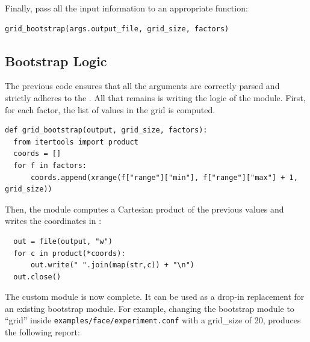Finally, pass all the input information to an appropriate function:
\begin{verbatim}
grid_bootstrap(args.output_file, grid_size, factors)
\end{verbatim}

\subsection{Bootstrap Logic}

The previous code ensures that all the arguments are correctly parsed and strictly adheres to the .
All that remains is writing the logic of the module. First, for each factor, the list of values in the grid is computed.

\begin{verbatim}
def grid_bootstrap(output, grid_size, factors):
  from itertools import product
  coords = []
  for f in factors:
      coords.append(xrange(f["range"]["min"], f["range"]["max"] + 1, grid_size))
\end{verbatim}

Then, the module computes a Cartesian product of the previous values and writes the coordinates in :

\begin{verbatim}
  out = file(output, "w")
  for c in product(*coords):
      out.write(" ".join(map(str,c)) + "\n")
  out.close()
\end{verbatim}

The custom module is now complete. It can be used as a drop-in replacement for an existing bootstrap module.
For example, changing the bootstrap module to ``grid'' inside \texttt{examples/face/experiment.conf} with a grid\_size of 20, produces the following report:

